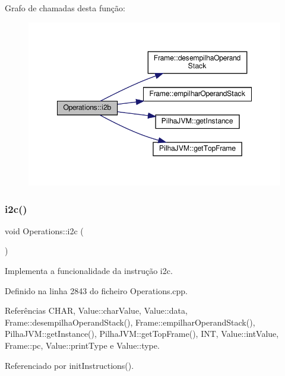 Grafo de chamadas desta função\+:
\nopagebreak
\begin{figure}[H]
\begin{center}
\leavevmode
\includegraphics[width=348pt]{classOperations_adfe0344bae5a1252330b7324e827ed35_cgraph}
\end{center}
\end{figure}
\mbox{\label{classOperations_a43b01132bf9acf598d0ced8719c194c7}} 
\subsubsection{\texorpdfstring{i2c()}{i2c()}}
{\footnotesize\ttfamily void Operations\+::i2c (\begin{DoxyParamCaption}{ }\end{DoxyParamCaption})\hspace{0.3cm}{\ttfamily [private]}}



Implementa a funcionalidade da instrução i2c. 



Definido na linha 2843 do ficheiro Operations.\+cpp.



Referências C\+H\+AR, Value\+::char\+Value, Value\+::data, Frame\+::desempilha\+Operand\+Stack(), Frame\+::empilhar\+Operand\+Stack(), Pilha\+J\+V\+M\+::get\+Instance(), Pilha\+J\+V\+M\+::get\+Top\+Frame(), I\+NT, Value\+::int\+Value, Frame\+::pc, Value\+::print\+Type e Value\+::type.



Referenciado por init\+Instructions().

